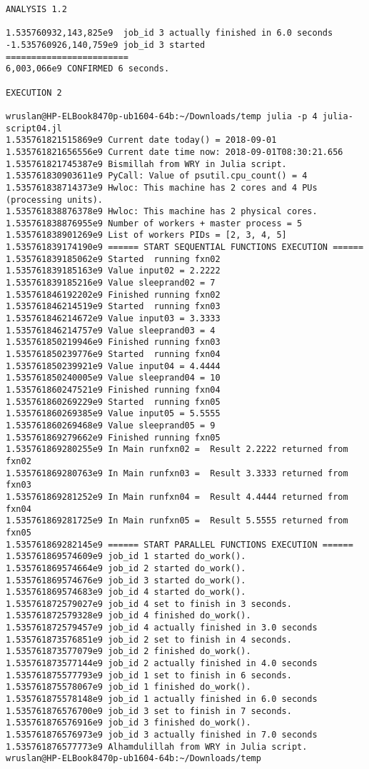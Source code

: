 \begin{lstlisting}[caption={App4-Julia Parallel Programming Codes}, label=App4-Julia Parallel Programming Codes]
ANALYSIS 1.2

1.535760932,143,825e9  job_id 3 actually finished in 6.0 seconds 
-1.535760926,140,759e9 job_id 3 started 
========================
6,003,066e9 CONFIRMED 6 seconds.

EXECUTION 2

wruslan@HP-ELBook8470p-ub1604-64b:~/Downloads/temp julia -p 4 julia-script04.jl
1.535761821515869e9 Current date today() = 2018-09-01
1.535761821656556e9 Current date time now: 2018-09-01T08:30:21.656
1.535761821745387e9 Bismillah from WRY in Julia script. 
1.535761830903611e9 PyCall: Value of psutil.cpu_count() = 4 
1.535761838714373e9 Hwloc: This machine has 2 cores and 4 PUs (processing units). 
1.535761838876378e9 Hwloc: This machine has 2 physical cores. 
1.535761838876955e9 Number of workers + master process = 5 
1.535761838901269e9 List of workers PIDs = [2, 3, 4, 5] 
1.535761839174190e9 ====== START SEQUENTIAL FUNCTIONS EXECUTION ====== 
1.535761839185062e9 Started  running fxn02 
1.535761839185163e9 Value input02 = 2.2222 
1.535761839185216e9 Value sleeprand02 = 7 
1.535761846192202e9 Finished running fxn02 
1.535761846214519e9 Started  running fxn03 
1.535761846214672e9 Value input03 = 3.3333 
1.535761846214757e9 Value sleeprand03 = 4 
1.535761850219946e9 Finished running fxn03 
1.535761850239776e9 Started  running fxn04 
1.535761850239921e9 Value input04 = 4.4444 
1.535761850240005e9 Value sleeprand04 = 10 
1.535761860247521e9 Finished running fxn04 
1.535761860269229e9 Started  running fxn05 
1.535761860269385e9 Value input05 = 5.5555 
1.535761860269468e9 Value sleeprand05 = 9 
1.535761869279662e9 Finished running fxn05 
1.535761869280255e9 In Main runfxn02 =  Result 2.2222 returned from fxn02 
1.535761869280763e9 In Main runfxn03 =  Result 3.3333 returned from fxn03 
1.535761869281252e9 In Main runfxn04 =  Result 4.4444 returned from fxn04 
1.535761869281725e9 In Main runfxn05 =  Result 5.5555 returned from fxn05 
1.535761869282145e9 ====== START PARALLEL FUNCTIONS EXECUTION ====== 
1.535761869574609e9 job_id 1 started do_work().
1.535761869574664e9 job_id 2 started do_work().
1.535761869574676e9 job_id 3 started do_work().
1.535761869574683e9 job_id 4 started do_work().
1.535761872579027e9 job_id 4 set to finish in 3 seconds. 
1.535761872579328e9 job_id 4 finished do_work(). 
1.535761872579457e9 job_id 4 actually finished in 3.0 seconds 
1.535761873576851e9 job_id 2 set to finish in 4 seconds. 
1.535761873577079e9 job_id 2 finished do_work(). 
1.535761873577144e9 job_id 2 actually finished in 4.0 seconds 
1.535761875577793e9 job_id 1 set to finish in 6 seconds. 
1.535761875578067e9 job_id 1 finished do_work(). 
1.535761875578148e9 job_id 1 actually finished in 6.0 seconds 
1.535761876576700e9 job_id 3 set to finish in 7 seconds. 
1.535761876576916e9 job_id 3 finished do_work(). 
1.535761876576973e9 job_id 3 actually finished in 7.0 seconds 
1.535761876577773e9 Alhamdulillah from WRY in Julia script. 
wruslan@HP-ELBook8470p-ub1604-64b:~/Downloads/temp 


\end{lstlisting}
